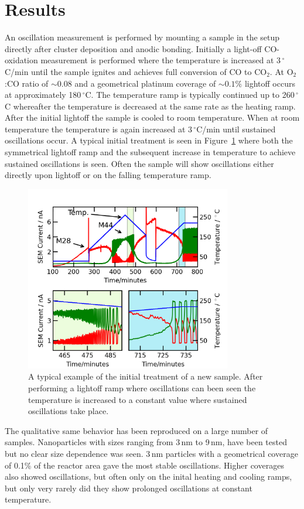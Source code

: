 \documentclass[8.5pt,twoside,twocolumn]{article}
\begin{document}
\section{Results}
An oscillation measurement is performed by mounting a sample in the setup directly after cluster deposition and anodic bonding. Initially a light-off CO-oxidation measurement is performed where the temperature is increased at 3\,$^\circ$C/min until the sample ignites and achieves full conversion of CO to CO$_2$. At O$_2$:CO ratio of $\sim0.08$ and a geometrical platinum coverage of $\sim0.1\%$ lightoff occurs at approximately 180\,$^\circ$C. The temperature ramp is typically continued up to 260\,$^\circ$C whereafter the temperature is decreased at the same rate as the heating ramp. After the initial lightoff the sample is cooled to room temperature. When at room temperature the temperature is again increased at 3\,$^\circ$C/min until sustained oscillations occur. A typical initial treatment is seen in Figure~\ref{fgr:initial_treatment} where both the symmetrical lightoff ramp and the subsequent increase in temperature to achieve sustained oscillations is seen. Often the sample will show oscillations either directly upon lightoff or on the falling temperature ramp.
\begin{figure}[h]
\centering
  \includegraphics[width=9cm]{initial_treatment.png}
  \caption{A typical example of the initial treatment of a new sample. After performing a lightoff ramp where oscillations can been seen the temperature is increased to a constant value where sustained oscillations take place.}
  \label{fgr:initial_treatment}
\end{figure}
The qualitative same behavior has been reproduced on a large number of samples. Nanoparticles with sizes ranging from 3\,nm to 9\,nm, have been tested but no clear size dependence was seen. 3\,nm particles with a geometrical coverage of 0.1\% of the reactor area gave the most stable oscillations. Higher coverages also showed oscillations, but often only on the inital heating and cooling ramps, but only very rarely did they show prolonged oscillations at constant temperature.
\end{document}
